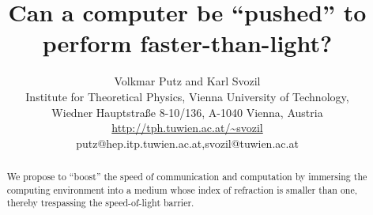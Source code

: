 \documentclass[12pt]{article}
\begin{document}
\title{Can a computer be ``pushed'' to perform faster-than-light?}


\author{Volkmar Putz and Karl Svozil\\
Institute for Theoretical Physics, Vienna University of Technology,  \\
Wiedner Hauptstra\ss e 8-10/136, A-1040 Vienna, Austria \\
\url{http://tph.tuwien.ac.at/~svozil}\\
{putz@hep.itp.tuwien.ac.at,svozil@tuwien.ac.at}
}


\maketitle

\begin{abstract}
We propose to ``boost'' the speed of communication and computation by immersing the computing environment into a medium whose index of refraction is smaller than one, thereby trespassing the speed-of-light barrier.
\end{abstract}
\end{document}
